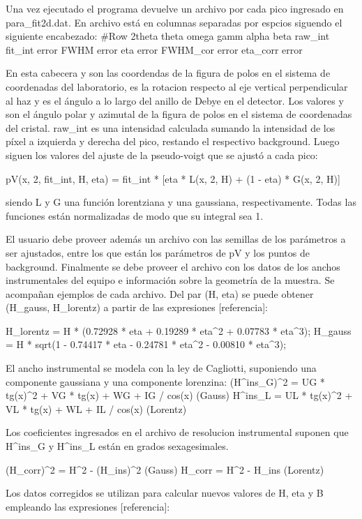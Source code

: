 Una vez ejecutado el programa devuelve un archivo por cada pico ingresado en para_fit2d.dat. En archivo está en columnas separadas por espcios siguendo el siguiente encabezado:
#Row 2theta theta  omega gamm alpha  beta raw_int fit_int  error FWHM error eta error FWHM_cor error eta_corr error

En esta cabecera \omega y \gamma son las coordendas de la figura de polos en el sistema de coordenadas del laboratorio, \omega es la rotacion respecto al eje vertical perpendicular al haz y \gamma es el ángulo a lo largo del anillo de Debye en el detector. Los valores \alpha y \beta son el ángulo polar y azimutal de la figura de polos en el sistema de coordenadas del cristal. raw_int es una intensidad calculada sumando la intensidad de los píxel a izquierda y derecha del pico, restando el respectivo background.
Luego siguen los valores del ajuste de la pseudo-voigt que se ajustó a cada pico:

pV(x, 2\theta, fit_int, H, eta) = fit_int * [eta * L(x, 2\theta, H) + (1 - eta) * G(x, 2\theta, H)]

siendo L y G una función lorentziana y una gaussiana, respectivamente. Todas las funciones están normalizadas de modo que su integral sea 1.

El usuario debe proveer además un archivo con las semillas de los parámetros a ser ajustados, entre los que están los parámetros de pV y los puntos de background.
Finalmente se debe proveer el archivo con los datos de los anchos instrumentales del equipo e información sobre la geometría de la muestra. Se acompañan ejemplos de cada archivo.
Del par (H, eta) se puede obtener (H_{gauss}, H_{lorentz}) a partir de las expresiones [referencia]:

H_{lorentz} = H * (0.72928 * eta + 0.19289 * eta^2 + 0.07783 * eta^3);
H_{gauss} = H * sqrt(1 - 0.74417 * eta - 0.24781 * eta^2 - 0.00810 * eta^3);

El ancho instrumental se modela con la ley de Cagliotti, suponiendo una componente gaussiana y una componente lorenzina:
(H^ins_G)^2 = UG * tg(x)^2 + VG * tg(x) + WG + IG / cos(x)  (Gauss)
H^ins_L = UL * tg(x)^2 + VL * tg(x) + WL + IL / cos(x)  (Lorentz)

Los coeficientes ingresados en el archivo de resolucion instrumental suponen que H^ins_G y H^ins_L están en grados sexagesimales.

(H_corr)^2 = H^2 - (H_ins)^2 (Gauss)
H_corr = H^2 - H_ins (Lorentz)

Los datos corregidos se utilizan para calcular nuevos valores de H, eta y B empleando las expresiones [referencia]:


